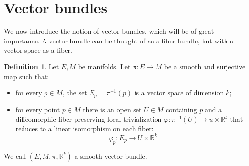 \documentclass[12pt,a4paper]{report}
\theoremstyle{definition}
\newtheorem{Def}{Definition}[chapter]
\theoremstyle{Theorem}
\theoremstyle{definition}
\theoremstyle{definition}
\begin{document}
			\section{Vector bundles}
			We now introduce the notion of vector bundles, which will be of great importance. A vector bundle can be thought of as a fiber bundle, but with a vector space as a fiber.
			\begin{Def}\label{Def_5.2}
				Let $E,M$ be manifolds. Let $\pi:E\rightarrow M$ be a smooth and surjective map such that:
				\begin{itemize}
					\item for every $p\in M$, the set $E_p=\pi^{-1}(p)$ is a vector space of dimension $k$;
					\item for every point $p\in M$ there is an open set $U\in M$ containing $p$ and a diffeomorphic fiber-preserving local trivialization $\varphi:\pi^{-1}(U)\rightarrow u\times \mathbb{R}^k$ that reduces to a linear isomorphism on each fiber:
					$$\varphi_p:E_p\rightarrow U\times \mathbb{R}^k$$
				\end{itemize}
				We call $(E,M,\pi,\mathbb{R}^k)$ a smooth vector bundle.
			\end{Def}
\end{document}
